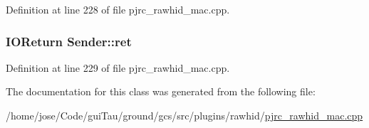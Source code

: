 Definition at line 228 of file pjrc\-\_\-rawhid\-\_\-mac.\-cpp.

\hypertarget{class_sender_aff1c122c343fa8ae82aa5b36ae2a17a7}{
\subsubsection[{ret}]{\setlength{\rightskip}{0pt plus 5cm}I\-O\-Return Sender\-::ret}}\label{class_sender_aff1c122c343fa8ae82aa5b36ae2a17a7}


Definition at line 229 of file pjrc\-\_\-rawhid\-\_\-mac.\-cpp.



The documentation for this class was generated from the following file\-:\begin{DoxyCompactItemize}
\item 
/home/jose/\-Code/gui\-Tau/ground/gcs/src/plugins/rawhid/\hyperlink{pjrc__rawhid__mac_8cpp}{pjrc\-\_\-rawhid\-\_\-mac.\-cpp}\end{DoxyCompactItemize}
